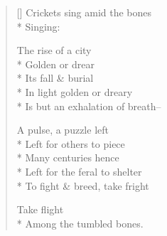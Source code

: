 \label{ch:august_evening}
\settowidth{\versewidth}{                                   Take  flight}
\begin{verse}[\versewidth]
Crickets sing amid the bones\\*
Singing:

               The rise of a city\\*
Golden or drear\\*
Its fall \& burial\\*
In light golden or dreary\\*
Is but an exhalation of breath--

A pulse, a puzzle   left\\*
Left for others to piece\\*
Many centuries hence\\*
Left for the feral to shelter\\*
To fight \& breed, take fright 

                                   Take  flight\\*
Among the tumbled bones.
\end{verse}
